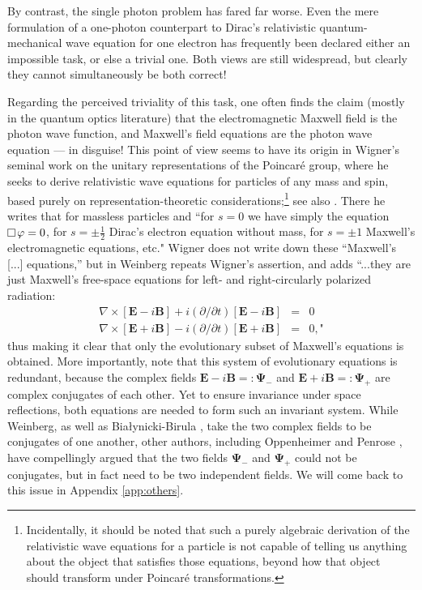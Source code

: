 \documentclass[11pt]{article}
\theoremstyle{definition}
\numberwithin{equation}{section}
\newcommand{\bB}{\mathbf{B}}
\newcommand{\bE}{\mathbf{E}}
\newcommand{\p}{\partial}
\newcommand{\bna}{\begin{eqnarray}}
\newcommand{\ena}{\end{eqnarray}}
\newcommand{\dal}{\raisebox{3pt}{\fbox{}}\,}
\begin{document}
 By contrast, the single photon problem has fared far worse.
 Even the mere formulation of a one-photon counterpart to Dirac's relativistic quantum-mechanical wave equation for one electron
has frequently been declared either an impossible task, or else a trivial one.
 Both views are still widespread, but clearly they cannot simultaneously be both correct!
  
 Regarding the perceived triviality of this task,  one often finds the claim (mostly in the quantum optics literature) that the electromagnetic 
Maxwell field is the photon wave function, and Maxwell's field equations are the photon wave equation --- in disguise!  
This point of view seems to have its origin in Wigner's seminal work \cite{Wig1939} on the unitary representations of the Poincar\'e group,
 where he seeks to derive relativistic wave equations for particles of any mass and spin, based purely on representation-theoretic 
considerations;\footnote{Incidentally, it should be noted that such a purely algebraic derivation of the 
relativistic wave equations for a particle is not capable of telling us anything about the object that satisfies those equations, beyond 
how that object should transform under Poincar\'e transformations.\vspace{-10pt}}
 see also \cite{BarWig1948}.
  There he writes that for massless particles and ``for $s = 0$ we have simply the equation $\dal \varphi = 0$,
for $s = \pm\frac{1}{2}$ Dirac's electron equation without mass, for $s = \pm 1$ Maxwell's electromagnetic equations, etc." 
 Wigner does not write down these ``Maxwell's [...] equations,'' but in \cite{Wei1964} Weinberg repeats Wigner's assertion, 
and adds ``...they are just Maxwell's free-space equations for left- and right-circularly polarized radiation:
\bna
\nabla \times [\bE - i\bB] + i(\p/\p t)[\bE - i\bB] & = & 0\\
\nabla \times [\bE + i \bB] - i(\p/\p t)[\bE + i\bB] & = & 0,\mbox{"}
\ena
thus making it clear that 
    only the evolutionary subset of Maxwell's equations is obtained.
 More importantly, note that this system of evolutionary equations is redundant, because
the complex fields $\bE - i\bB=:\boldsymbol{\Psi}_-$ and $\bE + i\bB=:\boldsymbol{\Psi}_+$ 
are complex conjugates of each other.
 Yet to ensure invariance under space reflections, both equations are needed to form such an invariant system. 
 While Weinberg, as well as Bia{\l}ynicki-Birula \cite{IBBphotonREV}, take the two complex fields 
to be conjugates of one another, other authors, including Oppenheimer \cite{OppiPHOTON} and Penrose \cite{Pen1976}, 
have compellingly argued that the two fields $\boldsymbol{\Psi}_-$ and $\boldsymbol{\Psi}_+$ 
could not be conjugates, but in fact need to be two independent fields. 
 We will come back to this issue in Appendix \ref{app:others}.
\end{document}
